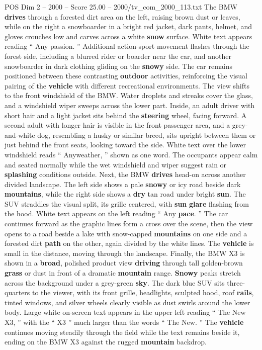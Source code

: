 \begin{textsample}{POS Dim 2 – 2000 – Score 25.00 – 2000/tv\_com\_2000\_113.txt}
The BMW \textbf{drives} through a forested dirt area on the left, raising brown dust or leaves, while on the right a snowboarder in a bright red jacket, dark pants, helmet, and gloves crouches low and carves across a white \textbf{snow} surface.
White text appears reading “ Any passion. ” Additional action-sport movement flashes through the forest side, including a blurred rider or boarder near the car, and another snowboarder in dark clothing gliding on the \textbf{snowy} side.
The car remains positioned between these contrasting \textbf{outdoor} activities, reinforcing the visual pairing of the \textbf{vehicle} with different recreational environments.
The view shifts to the front windshield of the BMW.
Water droplets and streaks cover the glass, and a windshield wiper sweeps across the lower part.
Inside, an adult driver with short hair and a light jacket sits behind the \textbf{steering} wheel, facing forward.
A second adult with longer hair is visible in the front passenger area, and a grey-and-white dog, resembling a husky or similar breed, sits upright between them or just behind the front seats, looking toward the side.
White text over the lower windshield reads “ Anyweather, ” shown as one word.
The occupants appear calm and seated normally while the wet windshield and wiper suggest rain or \textbf{splashing} conditions outside.
Next, the BMW \textbf{drives} head-on across another divided landscape.
The left side shows a pale \textbf{snowy} or icy road beside dark \textbf{mountains}, while the right side shows a \textbf{dry} tan road under bright \textbf{sun}.
The SUV straddles the visual split, its grille centered, with \textbf{sun} \textbf{glare} flashing from the hood.
White text appears on the left reading “ Any \textbf{pace}. ” The car continues forward as the graphic lines form a cross over the scene, then the view opens to a road beside a lake with snow-capped \textbf{mountains} on one side and a forested dirt \textbf{path} on the other, again divided by the white lines.
The \textbf{vehicle} is small in the distance, moving through the landscape.
Finally, the BMW X3 is shown in a \textbf{broad}, polished product view \textbf{driving} through tall golden-brown \textbf{grass} or dust in front of a dramatic \textbf{mountain} range. \textbf{Snowy} peaks stretch across the background under a grey-green \textbf{sky}.
The dark blue SUV sits three-quarters to the viewer, with its front grille, headlights, sculpted hood, roof \textbf{rails}, tinted windows, and silver wheels clearly visible as dust swirls around the lower body.
Large white on-screen text appears in the upper left reading “ The New X3, ” with the “ X3 ” much larger than the words “ The New. ” The \textbf{vehicle} continues moving steadily through the field while the text remains beside it, ending on the BMW X3 against the rugged \textbf{mountain} backdrop.

\end{textsample}
